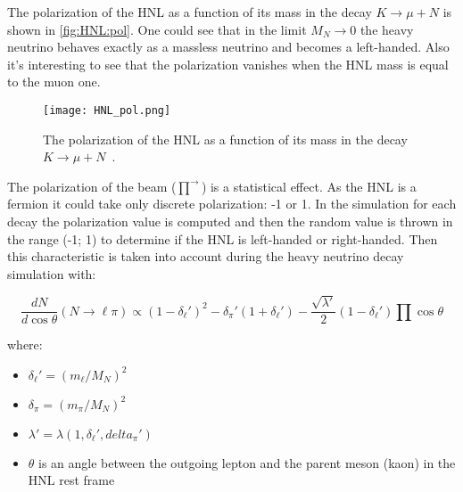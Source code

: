 \documentclass[../main.tex]{subfiles}
\begin{document}
The polarization of the HNL as a function of its mass in the decay $K\to\mu+N$ is shown in \autoref{fig:HNL:pol}. One could see that in the limit $M_N\to0$ the heavy neutrino behaves exactly as a massless neutrino and becomes a left-handed. Also it's interesting to see that the polarization vanishes when the HNL mass is equal to the muon one.

\begin{figure}[!ht]
    \centering
    \texttt{[image: HNL\_pol.png]}
    \caption{The polarization of the HNL as a function of its mass in the decay $K\to\mu+N$~\cite{Abgrall2014}.}
    \label{fig:HNL:pol}
\end{figure}

The polarization of the beam ($\overrightarrow{\prod}$) is a statistical effect. As the HNL is a fermion it could take only  discrete polarization: -1 or 1. In the simulation for each decay the polarization value is computed and then the random value is thrown in the range (-1; 1) to determine if the HNL is left-handed or right-handed. Then this characteristic is taken into account during the heavy neutrino decay simulation with:

\begin{equation}
    \frac{dN}{d\cos\theta}\left(N\to\ell\pi\right)\propto\left(1-\delta_\ell'\right)^2-\delta_\pi'\left(1+\delta_\ell'\right)-\frac{\sqrt{\lambda'}}{2}\left(1-\delta_\ell'\right)\prod\cos\theta
\end{equation}

where:
\begin{itemize}
    \item $\delta_\ell'=\left(m_\ell/M_N\right)^2$
    \item $\delta_\pi=\left(m_\pi/M_N\right)^2$
    \item $\lambda'=\lambda\left(1, \delta_\ell', delta_\pi'\right)$
    \item $\theta$ is an angle between the outgoing lepton and the parent meson (kaon) in the HNL rest frame
\end{itemize}
\end{document}

